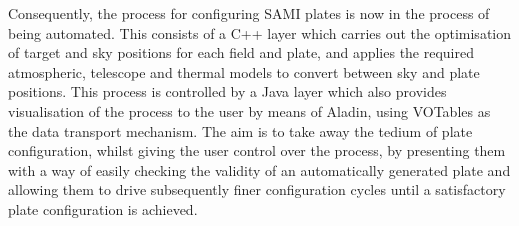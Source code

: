 Consequently, the process for configuring SAMI plates is now in the
process of being automated. This consists of a C++ layer which carries
out the optimisation of target and sky positions for each field and
plate, and applies the required atmospheric, telescope and thermal
models to convert between sky and plate positions. This process is
controlled by a Java layer which also provides visualisation of the
process to the user by means of Aladin, using
VOTables as the data transport mechanism. The aim is to take away the
tedium of plate configuration, whilst giving the user control over the
process, by presenting them with a way of easily checking the validity
of an automatically generated plate and allowing them to drive
subsequently finer configuration cycles until a satisfactory plate
configuration is achieved.



